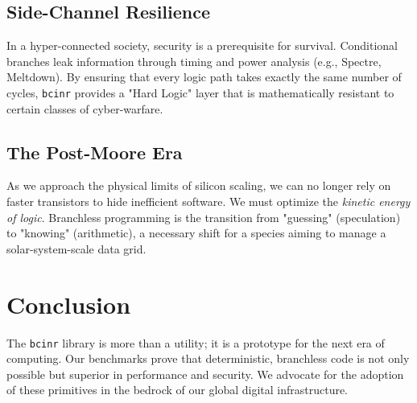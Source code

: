 \documentclass[twocolumn, 10pt]{article}
\begin{document}
\subsection{Side-Channel Resilience}
In a hyper-connected society, security is a prerequisite for survival. Conditional branches leak information through timing and power analysis (e.g., Spectre, Meltdown). By ensuring that every logic path takes exactly the same number of cycles, \texttt{bcinr} provides a "Hard Logic" layer that is mathematically resistant to certain classes of cyber-warfare.

\subsection{The Post-Moore Era}
As we approach the physical limits of silicon scaling, we can no longer rely on faster transistors to hide inefficient software. We must optimize the \textit{kinetic energy of logic}. Branchless programming is the transition from "guessing" (speculation) to "knowing" (arithmetic), a necessary shift for a species aiming to manage a solar-system-scale data grid.

\section{Conclusion}
The \texttt{bcinr} library is more than a utility; it is a prototype for the next era of computing. Our benchmarks prove that deterministic, branchless code is not only possible but superior in performance and security. We advocate for the adoption of these primitives in the bedrock of our global digital infrastructure.
\end{document}

